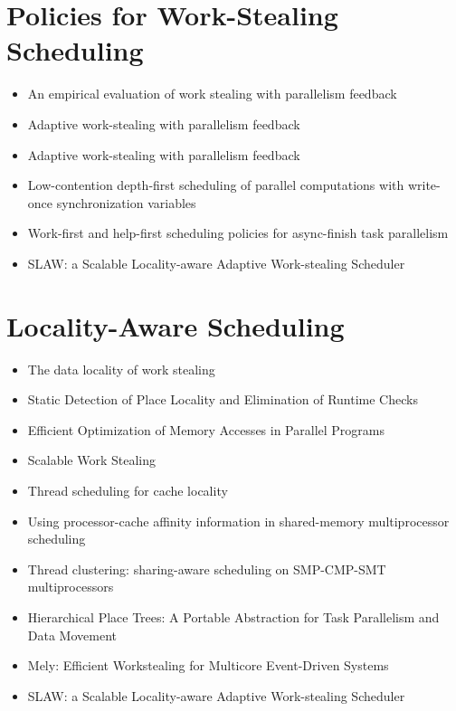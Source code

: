 \section*{Policies for Work-Stealing Scheduling}
\label{sec:lr-policies-for-work-stealing-scheduling}

\begin{itemize}
\item An empirical evaluation of work stealing with parallelism
  feedback \cite{Agrawal2006}
\item Adaptive work-stealing with parallelism feedback
  \cite{Agrawal2008}
\item Adaptive work-stealing with parallelism feedback
  \cite{Agrawal2008a}
\item Low-contention depth-first scheduling of parallel computations
  with write-once synchronization variables \cite{Fatourou2001}
\item Work-first and help-first scheduling policies for async-finish
  task parallelism \cite{Guo2009}
\item SLAW: a Scalable Locality-aware Adaptive Work-stealing Scheduler
  \cite{Guo2010}
\end{itemize}


\section*{Locality-Aware Scheduling}
\label{sec:lr-locality-aware-scheduling}

\begin{itemize}
\item[\checkmark] The data locality of work stealing \cite{Acar2002}
\item Static Detection of Place Locality and Elimination of Runtime
  Checks \cite{Agarwal2008}
\item Efficient Optimization of Memory Accesses in Parallel Programs
  \cite{Barik2009}
\item Scalable Work Stealing \cite{Dinan2009}
\item Thread scheduling for cache locality \cite{Philbin1996}
\item Using processor-cache affinity information in shared-memory
  multiprocessor scheduling \cite{Squillante1993}
\item Thread clustering: sharing-aware scheduling on SMP-CMP-SMT
  multiprocessors \cite{Tam2007}
\item Hierarchical Place Trees: A Portable Abstraction for Task
  Parallelism and Data Movement \cite{Yan2009}
\item Mely: Efficient Workstealing for Multicore Event-Driven Systems
  \cite{Gaud2010}
\item[\checkmark] SLAW: a Scalable Locality-aware Adaptive
  Work-stealing Scheduler \cite{Guo2010}
\end{itemize}


